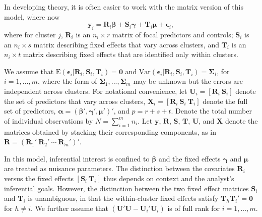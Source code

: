 \documentclass[12pt]{article}\usepackage[]{graphicx}\usepackage[]{color}
\newcommand{\E}{\text{E}}
\newcommand{\Var}{\text{Var}}
\newcommand{\bm}{\mathbf}
\newcommand{\bs}{\boldsymbol}
\begin{document}
In developing theory, it is often easier to work with the matrix version of this model, where now
\begin{equation}
\label{eq:fixed_effects}
\bm{y}_i = \bm{R}_i \bs\beta + \bm{S}_i \bs\gamma + \bm{T}_i \bs\mu + \bs\epsilon_i,
\end{equation}
where for cluster $j$, $\bm{R}_i$ is an $n_i \times r$ matrix of focal predictors and controls; $\bm{S}_i$ is an $n_i \times s$ matrix describing fixed effects that vary across clusters, and $\bm{T}_i$ is an $n_i \times t$ matrix describing fixed effects that are identified only within clusters. 

We assume that $\E\left(\bs\epsilon_i\left|\bm{R}_i,\bm{S}_i, \bm{T}_i\right.\right) = \bm{0}$ and $\Var\left(\bs\epsilon_i\left|\bm{R}_i,\bm{S}_i,\bm{T}_i\right.\right) = \bs\Sigma_i$, for $i = 1,...,m$, where the form of $\bs\Sigma_1,...,\bs\Sigma_m$ may be unknown but the errors are independent across clusters. 
For notational convenience, let $\bm{U}_i = \left[\bm{R}_i \ \bm{S}_i \right]$ denote the set of predictors that vary across clusters, $\bm{X}_i = \left[\bm{R}_i \ \bm{S}_i \ \bm{T}_i \right]$ denote the full set of predictors, $\bs\alpha = \left(\bs\beta', \bs\gamma', \bs\mu' \right)'$, and $p = r + s + t$.
Denote the total number of individual observations by $N = \sum_{i=1}^m n_i$.
Let $\bm{y}$, $\bm{R}$, $\bm{S}$, $\bm{T}$, $\bm{U}$, and $\bm{X}$ denote the matrices obtained by stacking their corresponding components, as in $\bm{R} = \left(\bm{R}_1' \ \bm{R}_2' \ \cdots \ \bm{R}_m'\right)'$. 

In this model, inferential interest is confined to $\bs\beta$ and the fixed effects $\bs\gamma$ and $\bs\mu$ are treated as nuisance parameters. The distinction between the covariates $\bm{R}_i$ versus the fixed effects $\left[\bm{S}_i \ \bm{T}_i\right]$ thus depends on context and the analyst's inferential goals. However, the distinction between the two fixed effect matrices $\bm{S}_i$ and $\bm{T}_i$ is unambiguous, in that the within-cluster fixed effects satisfy $\bm{T}_h \bm{T}_i' = \bm{0}$ for $h \neq i$. We further assume that $\left(\bm{U}'\bm{U} - \bm{U}_i'\bm{U}_i\right)$ is of full rank for $i = 1,...,m$.
\end{document}
